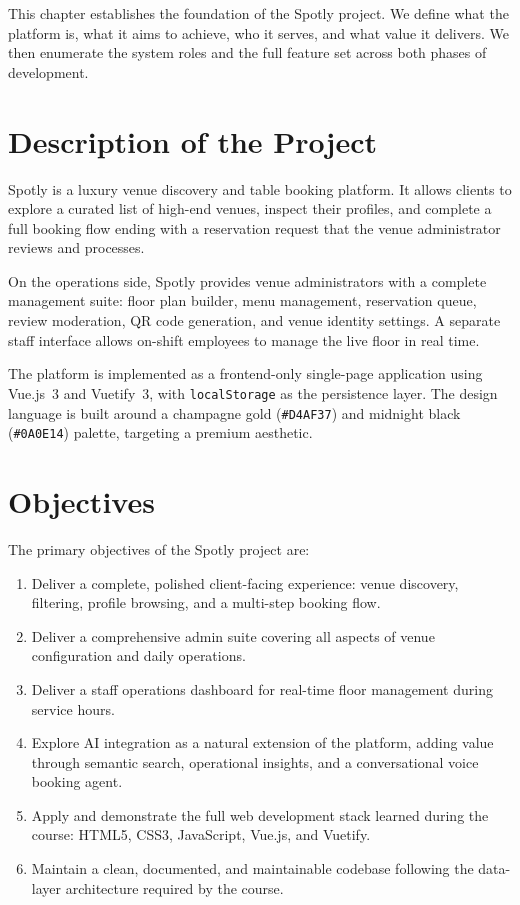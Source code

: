 \documentclass[12pt,a4paper,oneside]{report}
\begin{document}
This chapter establishes the foundation of the Spotly project. We define what
the platform is, what it aims to achieve, who it serves, and what value it
delivers. We then enumerate the system roles and the full feature set across
both phases of development.

\section{Description of the Project}

Spotly is a luxury venue discovery and table booking platform. It allows clients
to explore a curated list of high-end venues, inspect their profiles, and
complete a full booking flow ending with a reservation request that the venue
administrator reviews and processes.

On the operations side, Spotly provides venue administrators with a complete
management suite: floor plan builder, menu management, reservation queue,
review moderation, QR code generation, and venue identity settings. A separate
staff interface allows on-shift employees to manage the live floor in real time.

The platform is implemented as a frontend-only single-page application using
Vue.js~3 and Vuetify~3, with \texttt{localStorage} as the persistence layer.
The design language is built around a champagne gold (\texttt{\#D4AF37}) and
midnight black (\texttt{\#0A0E14}) palette, targeting a premium aesthetic.

\section{Objectives}

The primary objectives of the Spotly project are:

\begin{enumerate}[leftmargin=2em, topsep=4pt, itemsep=3pt]
  \item Deliver a complete, polished client-facing experience: venue discovery,
        filtering, profile browsing, and a multi-step booking flow.
  \item Deliver a comprehensive admin suite covering all aspects of venue
        configuration and daily operations.
  \item Deliver a staff operations dashboard for real-time floor management
        during service hours.
  \item Explore AI integration as a natural extension of the platform, adding
        value through semantic search, operational insights, and a conversational
        voice booking agent.
  \item Apply and demonstrate the full web development stack learned during the
        course: HTML5, CSS3, JavaScript, Vue.js, and Vuetify.
  \item Maintain a clean, documented, and maintainable codebase following the
        data-layer architecture required by the course.
\end{enumerate}
\end{document}
